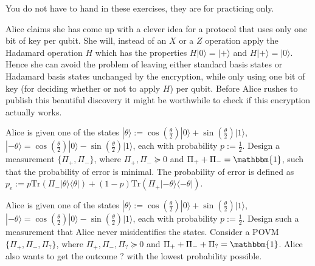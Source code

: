 \documentclass[a4paper,10pt,landscape,twocolumn]{scrartcl}
\newcommand{\ket}[1]{| #1 \rangle}
\newcommand{\proj}[1]{| #1 \rangle \langle #1 |}
\newcommand{\Tr}{\text{Tr}}
\begin{document}
\practiceproblems

{\sffamily\noindent
You do not have to hand in these exercises, they are for practicing only. %
}

\begin{exercise}[Quantum one time pad (Problem 3.1)]
Alice claims she has come up with a clever idea for a protocol that uses only one bit of key per qubit. She will, instead of an $X$ or a $Z$ operation apply the Hadamard operation $H$ which has the properties $H\ket{0}=\ket{+}$ and $H\ket{+}=\ket{0}$. Hence she can avoid the problem of leaving either standard basis states or Hadamard basis states unchanged by the encryption, while only using one bit of key (for deciding whether or not to apply $H$) per qubit. Before Alice rushes to publish this beautiful discovery it might be worthwhile to check if this encryption actually works.
\end{exercise}

\begin{exercise}
Alice is given one of the states $\ket{\theta}:=\cos\left(\frac{\theta}{2}\right)\ket{0}+\sin\left(\frac{\theta}{2}\right)\ket{1}$, $\ket{-\theta}=\cos\left(\frac{\theta}{2}\right)\ket{0}-\sin\left(\frac{\theta}{2}\right)\ket{1}$, each with probability $p:=\frac{1}{2}$. Design a measurement $\{ \Pi_{+},\Pi_{-}\}$, where $\Pi_{+},\Pi_{-}\succeq 0$ and $\Pi_{+}+\Pi_{-}= \mathbbm{1}$, such that the probability of error is minimal. The probability of error is defined as $p_e:= p\Tr(\Pi_{-}\proj{\theta})+(1-p)\Tr(\Pi_{+}\proj{-\theta})$.
\end{exercise}

\begin{exercise}
Alice is given one of the states $\ket{\theta}:=\cos\left(\frac{\theta}{2}\right)\ket{0}+\sin\left(\frac{\theta}{2}\right)\ket{1}$, $\ket{-\theta}=\cos\left(\frac{\theta}{2}\right)\ket{0}-\sin\left(\frac{\theta}{2}\right)\ket{1}$, each with probability $p:=\frac{1}{2}$. Design such a measurement that Alice never misidentifies the states. Consider a POVM $\{ \Pi_{+},\Pi_{-},\Pi_{?}\}$, where $\Pi_{+},\Pi_{-},\Pi_{?}\succeq 0$ and $\Pi_{+}+\Pi_{-}+\Pi_{?}= \mathbbm{1}$. Alice also wants to get the outcome $?$ with the lowest probability possible.
\end{exercise}
\end{document}
